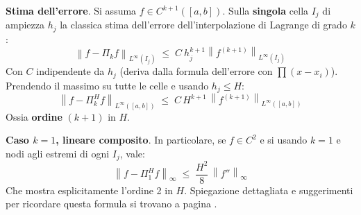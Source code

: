 \begin{enumerate}
    \textbf{Stima dell'errore}. Si assuma $f \in C^{k+1}\left(\left[a,b\right]\right)$. Sulla \textbf{singola} cella $I_{j}$ di ampiezza $h_{j}$ la classica stima dell'errore dell'interpolazione di Lagrange di grado $k$:
    \begin{equation*}
        \left\| f - \Pi_{k} f \right\|_{L^\infty \left(I_j\right)} \; \le \; C \: h_{j}^{k+1} \left\| f^{\left(k+1\right)} \right\|_{L^{\infty} \left(I_{j}\right)}
    \end{equation*}
    Con $C$ indipendente da $h_{j}$ (deriva dalla formula dell'errore con $\prod \left(x-x_{i}\right)$). Prendendo il massimo su tutte le celle e usando $h_{j} \le H$:
    \begin{equation*}
        \left\| f - \Pi_{k}^{H} f \right\|_{L^{\infty}\left(\left[a,b\right]\right)} \; \le \;
        C \, H^{k+1} \, \left\| f^{\left(k+1\right)} \right\|_{L^{\infty}\left(\left[a,b\right]\right)}
    \end{equation*}
    Ossia \textbf{ordine} $\left(k+1\right)$ in $H$.

    \textbf{Caso $k=1$, lineare composito}. In particolare, se $f \in C^{2}$ e si usando $k=1$ e nodi agli estremi di ogni $I_{j}$, vale:
    \begin{equation*}
        \left\| f - \Pi_{1}^{H} f \right\|_{\infty} \; \le \; \dfrac{H^{2}}{8} \, \left\| f'' \right\|_{\infty}
    \end{equation*}
    Che mostra esplicitamente l'ordine 2 in $H$. Spiegazione dettagliata e suggerimenti per ricordare questa formula si trovano a pagina \pageref{takeaways:interpolazione_composita}.
\end{enumerate}